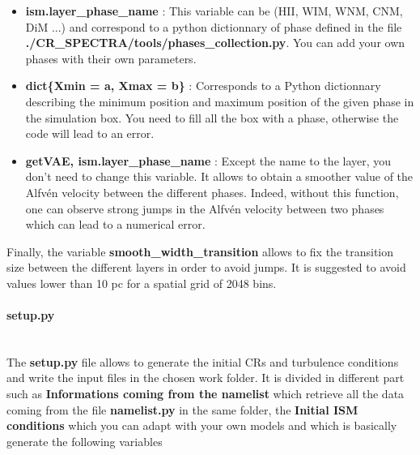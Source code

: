         \begin{itemize}
            \item {\bf{ism.layer\_phase\_name}} : This variable can be (HII, WIM, WNM, CNM, DiM ...) and correspond to a python dictionnary of phase defined in the file 
                                                {\bf{./CR\_SPECTRA/tools/phases\_collection.py}}. You can add your own phases with their own parameters. 
            \item {\bf{dict\{Xmin = a, Xmax = b\}}} : Corresponds to a Python dictionnary describing the minimum position and maximum position of the given phase in the 
                                                    simulation box. You need to fill all the box with a phase, otherwise the code will lead to an error. 
            \item {\bf{getVA{E, ism.layer\_phase\_name}}} : Except the name to the layer, you don't need to change this variable. It allows to obtain a smoother value of 
                                                        the Alfvén velocity between the different phases. Indeed, without this function, one can observe strong jumps 
                                                        in the Alfvén velocity between two phases which can lead to a numerical error.  
        \end{itemize}

        \noi Finally, the variable {\bf{smooth\_width\_transition}} allows to fix the transition size between the different layers in order to avoid jumps. It is 
        suggested to avoid values lower than 10 pc for a spatial grid of 2048 bins. 

        \paragraph*{setup.py} \\

        The {\bf{setup.py}} file allows to generate the initial CRs and turbulence conditions and write the input files in the chosen work folder. It is divided in 
        different part such as {\bf{Informations coming from the namelist}} which retrieve all the data coming from the file {\bf{namelist.py}} in the same folder, 
        the {\bf{Initial ISM conditions}} which you can adapt with your own models and which is basically generate the following variables 

